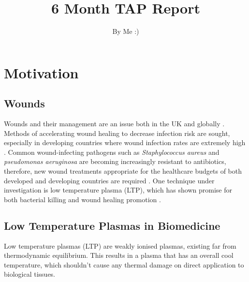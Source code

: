 \documentclass[11pt, oneside]{article}   	%
\title{6 Month TAP Report}
\author{By Me :)}
\date{}							%
\begin{document}
\maketitle

\section{Motivation}
\subsection{Wounds}

Wounds and their management are an issue both in the UK and globally \cite{Posnett2008the}.
Methods of accelerating wound healing to decrease infection risk are sought, especially in developing countries where wound infection rates are extremely high \cite{Kihla2014risk}. 
Common wound-infecting pathogens such as \textit{Staphylococcus aureus} and \textit{pseudomonas aeruginosa} \cite{Church2006burn, Bowler2001wound} are becoming increasingly resistant to antibiotics, therefore, new wound treatments appropriate for the healthcare budgets of both developed and developing countries are required \cite{Chambers2009waves, Godebo2013multidrug, Howell2005a}.
One technique under investigation is low temperature plasma (LTP), which has shown promise for both bacterial killing and wound healing promotion \cite{Kong2009plasma, Kramer2013suitability, Isbary2012successful, Isbary2010a}.

\subsection{Low Temperature Plasmas in Biomedicine}
Low temperature plasmas (LTP) are weakly ionised plasmas, existing far from thermodynamic equilibrium.
This results in a plasma that has an overall cool temperature, which shouldn't cause any thermal damage on direct application to biological tissues.
\end{document}
